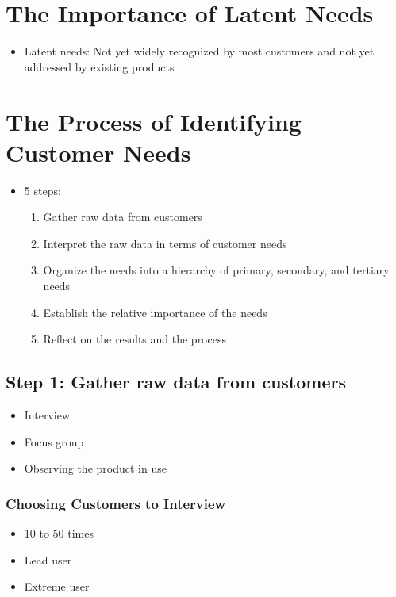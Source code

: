 \documentclass[a4paper,12pt,openany]{book}
\begin{document}
\section{The Importance of Latent Needs}
\begin{itemize}
    \item Latent needs: Not yet widely recognized by most customers and not yet addressed by existing products
\end{itemize}
\section{The Process of Identifying Customer Needs}
\begin{itemize}
    \item 5 steps:
    \begin{enumerate}
        \item Gather raw data from customers
        \item Interpret the raw data in terms of customer needs
        \item Organize the needs into a hierarchy of primary, secondary, and tertiary needs
        \item Establish the relative importance of the needs
        \item Reflect on the results and the process
    \end{enumerate}
\end{itemize}
\subsection{Step 1: Gather raw data from customers}
\begin{itemize}
    \item Interview
    \item Focus group
    \item Observing the product in use
\end{itemize}
\subsubsection{Choosing Customers to Interview}
\begin{itemize}
    \item 10 to 50 times
    \item Lead user
    \item Extreme user
\end{itemize}
\end{document}
